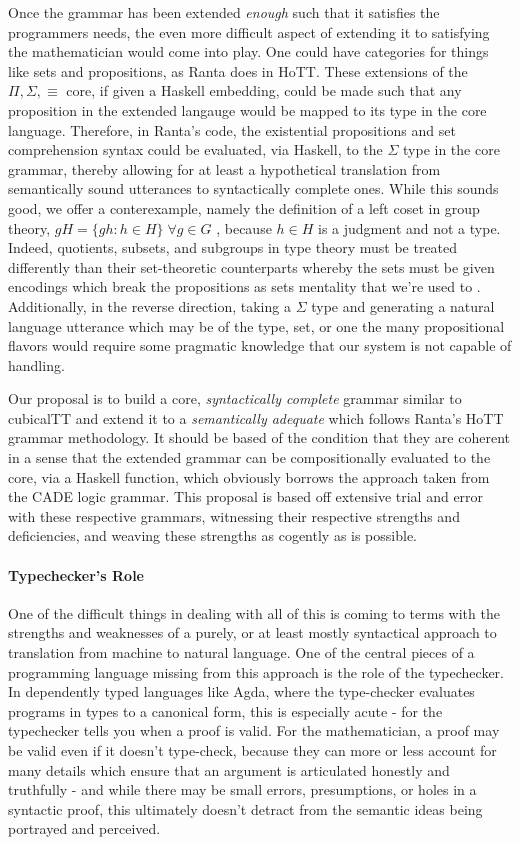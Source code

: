 Once the grammar has been extended \emph{enough} such that it satisfies the
programmers needs, the even more difficult aspect of extending it to satisfying
the mathematician would come into play. One could have categories for things
like sets and propositions, as Ranta does in HoTT. These extensions of the
$\Pi,\Sigma,\equiv$ core, if given a Haskell embedding, could be made such that
any proposition in the extended langauge would be mapped to its type in the core
language. Therefore, in Ranta's code, the existential propositions and set
comprehension syntax could be evaluated, via Haskell, to the $\Sigma$ type in
the core grammar, thereby allowing for at least a hypothetical translation from
semantically sound utterances to syntactically complete ones. While this sounds
good, we offer a conterexample, namely the definition of a left coset in group
theory, $gH = \{gh {:}h \in H\}\; \forall g \in G$ , because $h \in H$ is a
judgment and not a type. Indeed, quotients, subsets, and subgroups in type theory must be
treated differently than their set-theoretic counterparts whereby the
sets must be given encodings which break the propositions as sets mentality that
we're used to \cite{zipperer2016formalization}. Additionally, in the reverse
direction, taking a $\Sigma$ type and generating a natural language utterance
which may be of the type, set, or one the many propositional flavors would
require some pragmatic knowledge that our system is not capable of handling.

Our proposal is to build a core, \emph{syntactically complete} grammar similar
to cubicalTT and extend it to a \emph{semantically adequate} which follows
Ranta's HoTT grammar methodology. It should be based of the condition that they
are coherent in a sense that the extended grammar can be compositionally
evaluated to the core, via a Haskell function, which obviously borrows the
approach taken from the CADE logic grammar. This proposal is based off extensive
trial and error with these respective grammars, witnessing their respective
strengths and deficiencies, and weaving these strengths as cogently as is
possible.

\paragraph{Typechecker's Role}

One of the difficult things in dealing with all of this is coming to terms with
the strengths and weaknesses of a purely, or at least mostly syntactical
approach to translation from machine to natural language. One of the central
pieces of a programming language missing from this approach is the role of the
typechecker. In dependently typed languages like Agda, where the type-checker
evaluates programs in types to a canonical form, this is especially acute - for
the typechecker tells you when a proof is valid. For the mathematician, a proof
may be valid even if it doesn't type-check, because they can more or less
account for many details which ensure that an argument is articulated honestly
and truthfully - and while there may be small errors, presumptions, or holes in
a syntactic proof, this ultimately doesn't detract from the semantic ideas being
portrayed and perceived.

